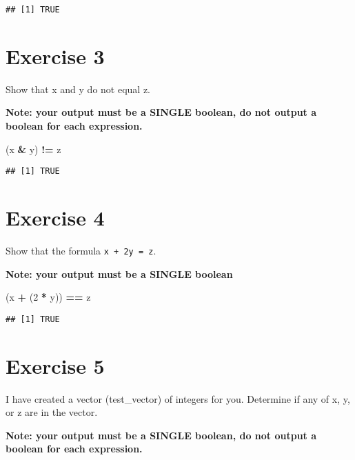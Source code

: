 \documentclass[
]{article}
\newenvironment{Shaded}{\begin{snugshade}}{\end{snugshade}}
\newcommand{\DecValTok}[1]{\textcolor[rgb]{0.00,0.00,0.81}{#1}}
\newcommand{\NormalTok}[1]{#1}
\newcommand{\SpecialCharTok}[1]{\textcolor[rgb]{0.81,0.36,0.00}{\textbf{#1}}}
\begin{document}
\begin{verbatim}
## [1] TRUE
\end{verbatim}

\section{Exercise 3}\label{exercise-3}

Show that x and y do not equal z.

\textbf{Note: your output must be a SINGLE boolean, do not output a
boolean for each expression.}

\begin{Shaded}
\begin{Highlighting}[]
\NormalTok{(x }\SpecialCharTok{\&}\NormalTok{ y) }\SpecialCharTok{!=}\NormalTok{ z}
\end{Highlighting}
\end{Shaded}

\begin{verbatim}
## [1] TRUE
\end{verbatim}

\section{Exercise 4}\label{exercise-4}

Show that the formula \texttt{x\ +\ 2y\ =\ z}.

\textbf{Note: your output must be a SINGLE boolean}

\begin{Shaded}
\begin{Highlighting}[]
\NormalTok{(x }\SpecialCharTok{+}\NormalTok{ (}\DecValTok{2} \SpecialCharTok{*}\NormalTok{ y)) }\SpecialCharTok{==}\NormalTok{ z}
\end{Highlighting}
\end{Shaded}

\begin{verbatim}
## [1] TRUE
\end{verbatim}

\section{Exercise 5}\label{exercise-5}

I have created a vector (test\_vector) of integers for you. Determine if
any of x, y, or z are in the vector.

\textbf{Note: your output must be a SINGLE boolean, do not output a
boolean for each expression.}
\end{document}
